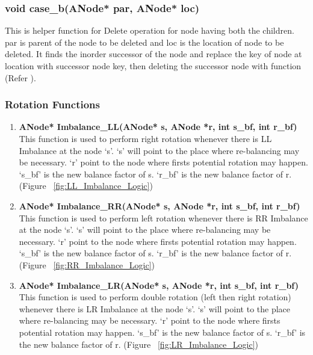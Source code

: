 \documentclass{article}
\begin{document}
\subsubsection{void case\_b(ANode* par, ANode* loc)}
\label{case_b}
This is helper function for Delete operation for node having both the children.
par is parent of the node to be deleted and loc is the location of node to be deleted.
It finds the inorder successor of the node and replace the key of node at location with successor node key, then deleting the successor node with function (Refer ).

\subsubsection{Rotation Functions}
\begin{enumerate}

\item \textbf{ANode* Imbalance\_LL(ANode* s, ANode *r, int s\_bf, int r\_bf)}\newline
    \label{itm:Imbalance_LL_func}
This function is used to perform right rotation whenever there is LL Imbalance at the node `s'.
`s' will point to the place where re-balancing may be necessary. `r' point to the node where firsts potential rotation may happen. `s\_bf' is the new balance factor of s. `r\_bf' is the new balance factor of r. (Figure ~\ref{fig:LL_Imbalance_Logic})
    
\item \textbf{ANode* Imbalance\_RR(ANode* s, ANode *r, int s\_bf, int r\_bf)}\newline
    \label{itm:Imbalance_RR_func}
This function is used to perform left rotation whenever there is RR Imbalance at the node `s'.
`s' will point to the place where re-balancing may be necessary. `r' point to the node where firsts potential rotation may happen. `s\_bf' is the new balance factor of s. `r\_bf' is the new balance factor of r. (Figure ~\ref{fig:RR_Imbalance_Logic})

\item \textbf{ANode* Imbalance\_LR(ANode* s, ANode *r, int s\_bf, int r\_bf)}\newline
    \label{itm:Imbalance_LR_func}
This function is used to perform double rotation (left then right rotation) whenever there is LR Imbalance at the node `s'.
`s' will point to the place where re-balancing may be necessary. `r' point to the node where firsts potential rotation may happen. `s\_bf' is the new balance factor of s. `r\_bf' is the new balance factor of r.  (Figure ~\ref{fig:LR_Imbalance_Logic})
    

\end{enumerate}
\end{document}
